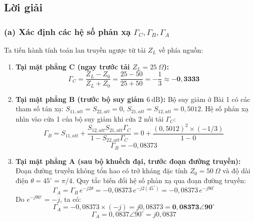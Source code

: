 \documentclass[12pt,a4paper]{article}
\begin{document}
\subsection{Lời giải}

\subsubsection{(a) Xác định các hệ số phản xạ $\Gamma_C, \Gamma_B, \Gamma_A$}
Ta tiến hành tính toán lan truyền ngược từ tải $Z_L$ về phía nguồn:
\begin{enumerate}
    \item \textbf{Tại mặt phẳng C (ngay trước tải $Z_L = 25~\Omega$):}
    \[
    \boxed{\Gamma_C = \frac{Z_L - Z_0}{Z_L + Z_0} = \frac{25 - 50}{25 + 50} = -\frac{1}{3} \approx \mathbf{-0{,}3333}}
    \]
    \item \textbf{Tại mặt phẳng B (trước bộ suy giảm $6~\text{dB}$):}
    Bộ suy giảm ở Bài 1 có các tham số tán xạ: $S_{11,att} = S_{22,att} = 0$, $S_{21,att} = S_{12,att} = 0{,}5012$.
    Hệ số phản xạ nhìn vào cửa 1 của bộ suy giảm khi cửa 2 nối tải $\Gamma_C$:
    \[
    \Gamma_B = S_{11,att} + \frac{S_{12,att} S_{21,att} \Gamma_C}{1 - S_{22,att}\Gamma_C} = 0 + \frac{(0{,}5012)^2 \times (-1/3)}{1 - 0}
    \]
    \[
    \boxed{\Gamma_B = -0{,}08373}
    \]
    \item \textbf{Tại mặt phẳng A (sau bộ khuếch đại, trước đoạn đường truyền):}
    Đoạn đường truyền không tổn hao có trở kháng đặc tính $Z_0 = 50~\Omega$ và độ dài điện $\theta = 45^\circ = \pi/4$.
    Quy tắc biến đổi hệ số phản xạ qua đoạn đường truyền:
    \[
    \Gamma_A = \Gamma_B \, e^{-j 2\theta} = -0{,}08373 \, e^{-j 2(45^\circ)} = -0{,}08373 \, e^{-j 90^\circ}
    \]
    Do $e^{-j 90^\circ} = -j$, ta có:
    \[
    \Gamma_A = -0{,}08373 \times (-j) = j 0{,}08373 = \mathbf{0{,}08373 \angle 90^\circ}
    \]
    \[
    \boxed{\Gamma_A = 0{,}0837 \angle 90^\circ = j0{,}0837}
    \]
\end{enumerate}
\end{document}

